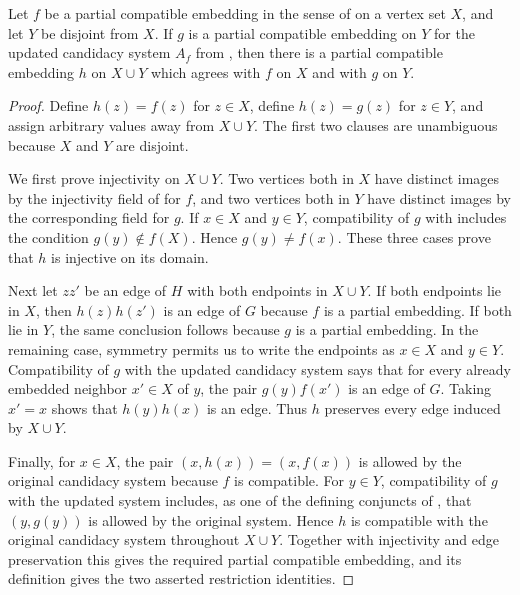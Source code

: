 \begin{lemma}
Let $f$ be a partial compatible embedding in the sense of  on a vertex set $X$, and let $Y$ be disjoint from $X$.  If $g$ is a partial compatible embedding on $Y$ for the updated candidacy system $A_f$ from , then there is a partial compatible embedding $h$ on $X\cup Y$ which agrees with $f$ on $X$ and with $g$ on $Y$.
\end{lemma}
\begin{proof}
Define $h(z)=f(z)$ for $z\in X$, define $h(z)=g(z)$ for $z\in Y$, and assign arbitrary values away from $X\cup Y$.  The first two clauses are unambiguous because $X$ and $Y$ are disjoint.

We first prove injectivity on $X\cup Y$.  Two vertices both in $X$ have distinct images by the injectivity field of  for $f$, and two vertices both in $Y$ have distinct images by the corresponding field for $g$.  If $x\in X$ and $y\in Y$, compatibility of $g$ with  includes the condition $g(y)\notin f(X)$.  Hence $g(y)\ne f(x)$.  These three cases prove that $h$ is injective on its domain.

Next let $zz'$ be an edge of $H$ with both endpoints in $X\cup Y$.  If both endpoints lie in $X$, then $h(z)h(z')$ is an edge of $G$ because $f$ is a partial embedding.  If both lie in $Y$, the same conclusion follows because $g$ is a partial embedding.  In the remaining case, symmetry permits us to write the endpoints as $x\in X$ and $y\in Y$.  Compatibility of $g$ with the updated candidacy system says that for every already embedded neighbor $x'\in X$ of $y$, the pair $g(y)f(x')$ is an edge of $G$.  Taking $x'=x$ shows that $h(y)h(x)$ is an edge.  Thus $h$ preserves every edge induced by $X\cup Y$.

Finally, for $x\in X$, the pair $(x,h(x))=(x,f(x))$ is allowed by the original candidacy system because $f$ is compatible.  For $y\in Y$, compatibility of $g$ with the updated system includes, as one of the defining conjuncts of , that $(y,g(y))$ is allowed by the original system.  Hence $h$ is compatible with the original candidacy system throughout $X\cup Y$.  Together with injectivity and edge preservation this gives the required partial compatible embedding, and its definition gives the two asserted restriction identities.
\end{proof}
